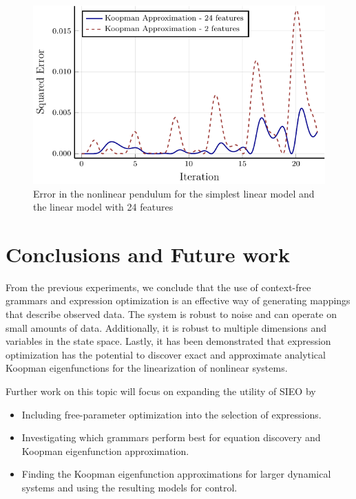 \documentclass{article}
\begin{document}
\begin{figure}
\vskip 0.2in
\begin{center}
\centerline{\includegraphics[width=\columnwidth]{./figures/pendulum}}
\caption{Error in the nonlinear pendulum for the simplest linear model and the linear model with 24 features}
\label{fig:pendulum}
\end{center}
\vskip -0.2in
\end{figure}

\section{Conclusions and Future work}
\label{conclusion}

From the previous experiments, we conclude that the use of context-free grammars and expression optimization is an effective way of generating mappings that describe observed data. The system is robust to noise and can operate on small amounts of data. Additionally, it is robust to multiple dimensions and variables in the state space. Lastly, it has been demonstrated that expression optimization has the potential to discover exact and approximate analytical Koopman eigenfunctions for the linearization of nonlinear systems. 

Further work on this topic will focus on expanding the utility of SIEO by 
\begin{itemize}
\item Including free-parameter optimization into the selection of expressions.
\item Investigating which grammars perform best for equation discovery and Koopman eigenfunction approximation.
\item Finding the Koopman eigenfunction approximations for larger dynamical systems and using the resulting models for control.

\end{itemize}







\end{document}
